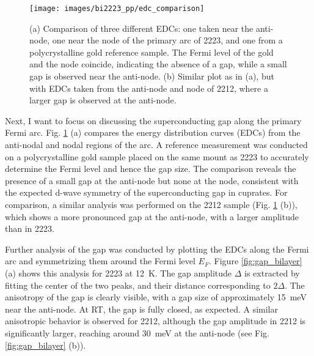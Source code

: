 \begin{figure}[t]
	\centering
	\texttt{[image: images/bi2223\_pp/edc\_comparison]}
	\caption{(a) Comparison of three different EDCs: one taken near the anti-node, one near the node of the primary arc of 2223, and one from a polycrystalline gold reference sample. The Fermi level of the gold and the node coincide, indicating the absence of a gap, while a small gap is observed near the anti-node. (b) Similar plot as in (a), but with EDCs taken from the anti-node and node of 2212, where a larger gap is observed at the anti-node.}
	\label{fig:edc_comparison}
\end{figure}


Next, I want to focus on discussing the superconducting gap along the primary Fermi arc.
Fig. \ref{fig:edc_comparison} (a) compares the energy distribution curves (EDCs) from the anti-nodal and nodal regions of the arc.
A reference measurement was conducted on a polycrystalline gold sample placed on the same mount as 2223 to accurately determine the Fermi level and hence the gap size.
The comparison reveals the presence of a small gap at the anti-node but none at the node, consistent with the expected d-wave symmetry of the superconducting gap in cuprates.
For comparison, a similar analysis was performed on the 2212 sample (Fig. \ref{fig:edc_comparison} (b)), which shows a more pronounced gap at the anti-node, with a larger amplitude than in 2223.

Further analysis of the gap was conducted by plotting the EDCs along the Fermi arc and symmetrizing them around the Fermi level $E_F$.
Figure \ref{fig:gap_bilayer} (a) shows this analysis for 2223 at \qty{12}{\kelvin}.
The gap amplitude $\Delta$ is extracted by fitting the center of the two peaks, and their distance corresponding to $2\Delta$.
The anisotropy of the gap is clearly visible, with a gap size of approximately \qty{15}{\milli\electronvolt} near the anti-node.
At RT, the gap is fully closed, as expected.
A similar anisotropic behavior is observed for 2212, although the gap amplitude in 2212 is significantly larger, reaching around \qty{30}{\milli\electronvolt} at the anti-node (see Fig. \ref{fig:gap_bilayer} (b)).


